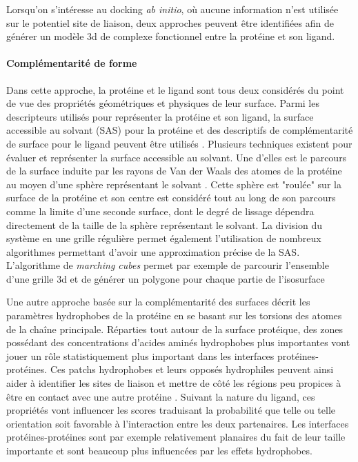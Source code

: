 Lorsqu'on s'intéresse au docking \textit{ab initio}, où aucune information n'est utilisée sur le potentiel site de liaison, deux approches peuvent être identifiées afin de générer un modèle 3d de complexe fonctionnel entre la protéine et son ligand.

\paragraph{Complémentarité de forme}

Dans cette approche, la protéine et le ligand sont tous deux considérés du point de vue des propriétés géométriques et physiques de leur surface. Parmi les descripteurs utilisés pour représenter la protéine et son ligand, la surface accessible au solvant (SAS) pour la protéine et des descriptifs de complémentarité de surface pour le ligand peuvent être utilisés \cite{shoichet1992molecular}. Plusieurs techniques existent pour évaluer et représenter la surface accessible au solvant. Une d'elles est le parcours de la surface induite par les rayons de Van der Waals des atomes de la protéine au moyen d'une sphère représentant le solvant \cite{connolly1983analytical}. Cette sphère est "roulée" sur la surface de la protéine et son centre est considéré tout au long de son parcours comme la limite d'une seconde surface, dont le degré de lissage dépendra directement de la taille de la sphère représentant le solvant. La division du système en une grille régulière permet également l'utilisation de nombreux algorithmes permettant d'avoir une approximation précise de la SAS. L'algorithme de \textit{marching cubes} permet par exemple de parcourir l'ensemble d'une grille 3d et de générer un polygone pour chaque partie de l'isosurface 

Une autre approche basée sur la complémentarité des surfaces décrit les paramètres hydrophobes de la protéine en se basant sur les torsions des atomes de la chaîne principale. Réparties tout autour de la surface protéique, des zones possédant des concentrations d'acides aminés hydrophobes plus importantes vont jouer un rôle statistiquement plus important dans les interfaces protéines-protéines. Ces patchs hydrophobes et leurs opposés hydrophiles peuvent ainsi aider à identifier les sites de liaison et mettre de côté les régions peu propices à être en contact avec une autre protéine \cite{jones1996principles}. Suivant la nature du ligand, ces propriétés vont influencer les scores traduisant la probabilité que telle ou telle orientation soit favorable à l'interaction entre les deux partenaires. Les interfaces protéines-protéines sont par exemple relativement planaires du fait de leur taille importante et sont beaucoup plus influencées par les effets hydrophobes.

